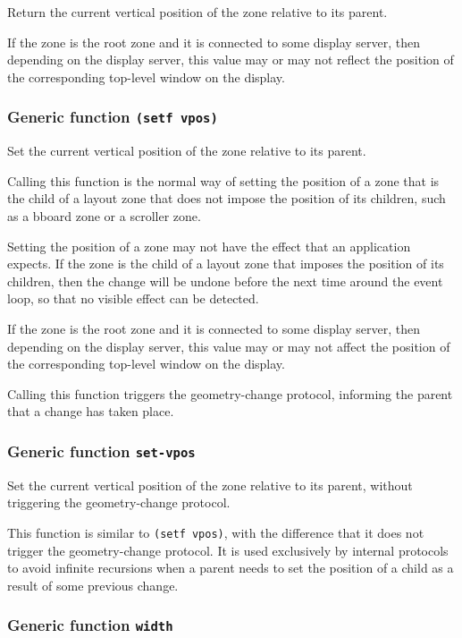 \documentclass{report}
\begin{document}
Return the current vertical position of the zone relative to its
parent.  

If the zone is the root zone and it is connected to some display
server, then depending on the display server, this value may or
may not reflect the position of the corresponding top-level window
on the display.

\subsubsection{Generic function \texttt{(setf vpos)}}

Set the current vertical position of the zone relative to its
parent.

Calling this function is the normal way of setting the position of
a zone that is the child of a layout zone that does not impose the
position of its children, such as a bboard zone or a scroller
zone.

Setting the position of a zone may not have the effect that an
application expects.  If the zone is the child of a layout zone
that imposes the position of its children, then the change will be
undone before the next time around the event loop, so that no
visible effect can be detected.  

If the zone is the root zone and it is connected to some display
server, then depending on the display server, this value may or
may not affect the position of the corresponding top-level window
on the display.

Calling this function triggers the geometry-change protocol,
informing the parent that a change has taken place.  

\subsubsection{Generic function \texttt{set-vpos}}

Set the current vertical position of the zone relative to its
parent, without triggering the geometry-change protocol.

This function is similar to \texttt{(setf vpos)}, with the difference
that it does not trigger the geometry-change protocol.  It is used
exclusively by internal protocols to avoid infinite recursions when a
parent needs to set the position of a child as a result of some
previous change.

\subsubsection{Generic function \texttt{width}}
\end{document}
